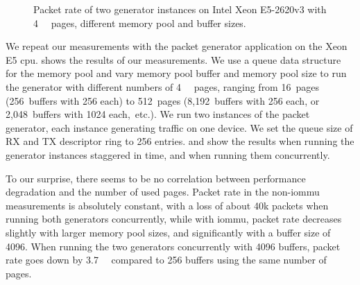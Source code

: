 \begin{figure}%
    \centering
    \par

    \caption{Packet rate of two generator instances on Intel Xeon E5-2620v3 with
    \SI{4}{\kibi\byte} pages, different memory pool and buffer sizes.}
    \label{fig:page-size-generator}
\end{figure}

We repeat our measurements with the packet generator application on the Xeon E5
\ac{cpu}.  shows the results of our measurements.
We use a queue data structure for the memory pool and vary memory pool buffer
and memory pool size to run the generator with different numbers of
\SI{4}{\kibi\byte} pages, ranging from 16~pages (256~buffers with
\SI{256}{\byte} each) to 512~pages (8,192~buffers with \SI{256}{\byte} each, or
2,048~buffers with \SI{1024}{\byte} each,~etc.). We run two instances of the
packet generator, each instance generating traffic on one device. We set the
queue size of RX and TX descriptor ring to 256 entries.
 and
 show the results
when running the generator instances staggered in time,
 and
 when running them
concurrently.

To our surprise, there seems to be no correlation between performance
degradation and the number of used pages. Packet rate in the non-\ac{iommu}
measurements is absolutely constant, with a loss of about 40k packets when
running both generators concurrently, while with \ac{iommu}, packet rate
decreases slightly with larger memory pool sizes, and significantly with a
buffer size of \SI{4096}{\byte}. When running the two generators concurrently
with \SI{4096}{\byte} buffers, packet rate goes down by \SI{3.7}{\mega\pps}
compared to \SI{256}{\byte} buffers using the same number of pages.

